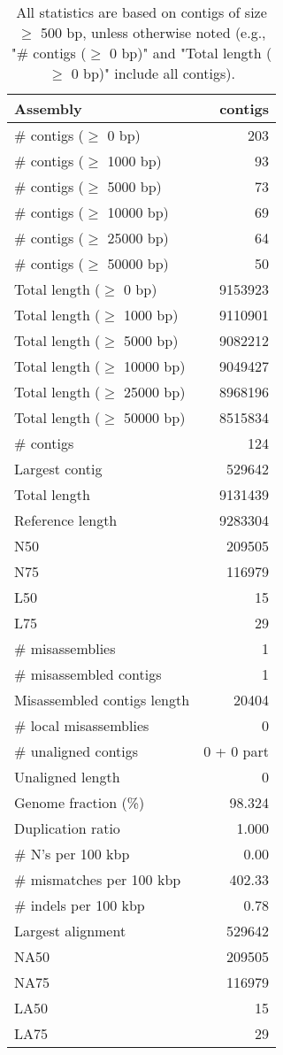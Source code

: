 \documentclass[12pt,a4paper]{article}
\begin{document}
\begin{table}[ht]
\begin{center}
\caption{All statistics are based on contigs of size $\geq$ 500 bp, unless otherwise noted (e.g., "\# contigs ($\geq$ 0 bp)" and "Total length ($\geq$ 0 bp)" include all contigs).}
\begin{tabular}{|l*{1}{|r}|}
\hline
Assembly & contigs \\ \hline
\# contigs ($\geq$ 0 bp) & 203 \\ \hline
\# contigs ($\geq$ 1000 bp) & 93 \\ \hline
\# contigs ($\geq$ 5000 bp) & 73 \\ \hline
\# contigs ($\geq$ 10000 bp) & 69 \\ \hline
\# contigs ($\geq$ 25000 bp) & 64 \\ \hline
\# contigs ($\geq$ 50000 bp) & 50 \\ \hline
Total length ($\geq$ 0 bp) & 9153923 \\ \hline
Total length ($\geq$ 1000 bp) & 9110901 \\ \hline
Total length ($\geq$ 5000 bp) & 9082212 \\ \hline
Total length ($\geq$ 10000 bp) & 9049427 \\ \hline
Total length ($\geq$ 25000 bp) & 8968196 \\ \hline
Total length ($\geq$ 50000 bp) & 8515834 \\ \hline
\# contigs & 124 \\ \hline
Largest contig & 529642 \\ \hline
Total length & 9131439 \\ \hline
Reference length & 9283304 \\ \hline
N50 & 209505 \\ \hline
N75 & 116979 \\ \hline
L50 & 15 \\ \hline
L75 & 29 \\ \hline
\# misassemblies & 1 \\ \hline
\# misassembled contigs & 1 \\ \hline
Misassembled contigs length & 20404 \\ \hline
\# local misassemblies & 0 \\ \hline
\# unaligned contigs & 0 + 0 part \\ \hline
Unaligned length & 0 \\ \hline
Genome fraction (\%) & 98.324 \\ \hline
Duplication ratio & 1.000 \\ \hline
\# N's per 100 kbp & 0.00 \\ \hline
\# mismatches per 100 kbp & 402.33 \\ \hline
\# indels per 100 kbp & 0.78 \\ \hline
Largest alignment & 529642 \\ \hline
NA50 & 209505 \\ \hline
NA75 & 116979 \\ \hline
LA50 & 15 \\ \hline
LA75 & 29 \\ \hline
\end{tabular}
\end{center}
\end{table}
\end{document}
